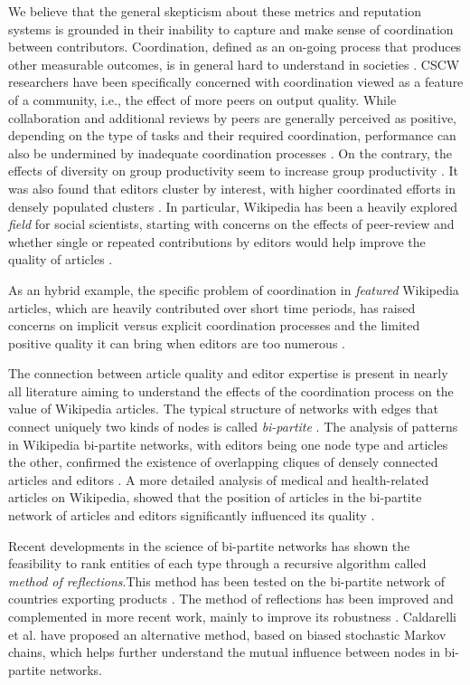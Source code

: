 We believe that the general skepticism about these metrics and reputation systems is grounded in their inability to capture and make sense of coordination between contributors. Coordination, defined as an on-going process that produces other measurable outcomes, is in general hard to understand in societies \cite{ostrom1990}. CSCW researchers have been specifically concerned with coordination viewed as a feature of a community, i.e., the effect of more peers on output quality. While collaboration and additional reviews by peers are generally perceived as positive, depending on the type of tasks and their required coordination, performance can also be undermined by inadequate coordination processes \cite{kittur2009coordination}. On the contrary, the effects of diversity on group productivity seem to increase group productivity \cite{chen2010}. It was also found that editors cluster by interest, with higher coordinated efforts in densely populated clusters \cite{jesus2009}. In particular, Wikipedia has been a heavily explored {\it field} for social scientists, starting with concerns on the effects of peer-review and whether single or repeated contributions by editors would help improve the quality of articles \cite{hu2007articlequality,wilkinson2007}. 

As an hybrid example, the specific problem of coordination in {\it featured} Wikipedia articles, which are heavily contributed over short time periods, has raised concerns on implicit versus explicit coordination processes and the limited positive quality it can bring when editors are too numerous \cite{kittur2008}.
 
The connection between article quality and editor expertise is present in nearly all literature aiming to understand the effects of the coordination process on the value of Wikipedia articles. The typical structure of networks with edges that connect uniquely two kinds of nodes is called {\it bi-partite} \cite{newman2001}. The analysis of patterns in Wikipedia bi-partite networks, with editors being one node type and articles the other, confirmed the existence of overlapping cliques of densely connected articles and editors  \cite{jesus2009}. A more detailed analysis of medical and health-related articles on Wikipedia, showed that the position of articles in the bi-partite network of articles and editors significantly influenced its quality \cite{kane2009}. 

Recent developments in the science of bi-partite networks has shown the feasibility to rank entities of each type through a recursive algorithm called  {\it method of reflections}.This method has been tested on the bi-partite network of countries exporting products \cite{hidalgo2007,hidalgo2009}. The method of reflections has been improved and complemented in more recent work, mainly to improve its robustness \cite{tacchella2012new, cristelli2012competitors, tacchella2013economic, cristelli2013measuring}. Caldarelli et al. \cite{caldarelli2012network} have proposed an alternative method, based on biased stochastic Markov chains, which helps further understand the mutual influence between nodes in bi-partite networks.




